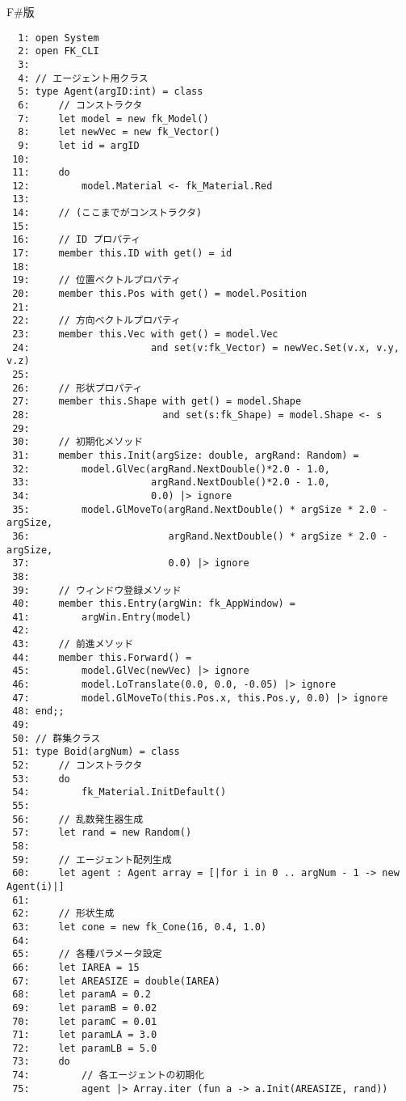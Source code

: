 \begin{center}
F\#版
\end{center}
\begin{breakbox}
\begin{small}
\begin{verbatim}
  1: open System
  2: open FK_CLI
  3: 
  4: // エージェント用クラス
  5: type Agent(argID:int) = class
  6:     // コンストラクタ
  7:     let model = new fk_Model()
  8:     let newVec = new fk_Vector()
  9:     let id = argID
 10: 
 11:     do
 12:         model.Material <- fk_Material.Red
 13: 
 14:     // (ここまでがコンストラクタ)
 15: 
 16:     // ID プロパティ
 17:     member this.ID with get() = id
 18: 
 19:     // 位置ベクトルプロパティ
 20:     member this.Pos with get() = model.Position
 21: 
 22:     // 方向ベクトルプロパティ
 23:     member this.Vec with get() = model.Vec
 24:                     and set(v:fk_Vector) = newVec.Set(v.x, v.y, v.z)
 25: 
 26:     // 形状プロパティ
 27:     member this.Shape with get() = model.Shape
 28:                       and set(s:fk_Shape) = model.Shape <- s 
 29: 
 30:     // 初期化メソッド
 31:     member this.Init(argSize: double, argRand: Random) =
 32:         model.GlVec(argRand.NextDouble()*2.0 - 1.0,
 33:                     argRand.NextDouble()*2.0 - 1.0,
 34:                     0.0) |> ignore
 35:         model.GlMoveTo(argRand.NextDouble() * argSize * 2.0 - argSize,
 36:                        argRand.NextDouble() * argSize * 2.0 - argSize,
 37:                        0.0) |> ignore
 38: 
 39:     // ウィンドウ登録メソッド
 40:     member this.Entry(argWin: fk_AppWindow) =
 41:         argWin.Entry(model)
 42: 
 43:     // 前進メソッド
 44:     member this.Forward() =
 45:         model.GlVec(newVec) |> ignore
 46:         model.LoTranslate(0.0, 0.0, -0.05) |> ignore
 47:         model.GlMoveTo(this.Pos.x, this.Pos.y, 0.0) |> ignore
 48: end;;
 49: 
 50: // 群集クラス
 51: type Boid(argNum) = class
 52:     // コンストラクタ
 53:     do
 54:         fk_Material.InitDefault()
 55: 
 56:     // 乱数発生器生成
 57:     let rand = new Random()
 58: 
 59:     // エージェント配列生成
 60:     let agent : Agent array = [|for i in 0 .. argNum - 1 -> new Agent(i)|]
 61: 
 62:     // 形状生成
 63:     let cone = new fk_Cone(16, 0.4, 1.0)
 64: 
 65:     // 各種パラメータ設定
 66:     let IAREA = 15
 67:     let AREASIZE = double(IAREA)
 68:     let paramA = 0.2
 69:     let paramB = 0.02
 70:     let paramC = 0.01
 71:     let paramLA = 3.0
 72:     let paramLB = 5.0
 73:     do
 74:         // 各エージェントの初期化
 75:         agent |> Array.iter (fun a -> a.Init(AREASIZE, rand))

\end{verbatim}
\end{small}
\end{breakbox}
